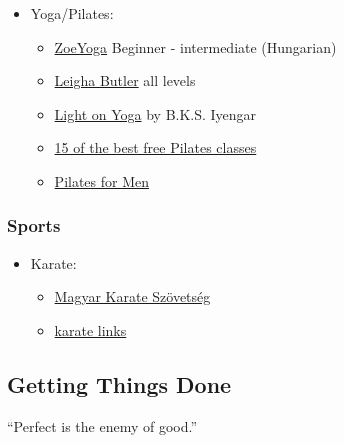 \documentclass{article}
\begin{document}
\begin{itemize}
    \item Yoga/Pilates:
    \begin{itemize}
        \item \href{https://www.facebook.com/kosazoe}{ZoeYoga} Beginner - intermediate (Hungarian)
        \item \href{https://www.youtube.com/channel/UCmHii9X_Ct0uWGOE-DibvbQ}{Leigha Butler} all levels
        \item \href{https://www.goodreads.com/book/show/56301.Light_on_Yoga}{Light on Yoga} by B.K.S. Iyengar
        \item \href{https://www.womenshealthmag.com/uk/fitness/workouts/a707014/best-pilates-youtube-workouts/}{15 of the best free Pilates classes}
        \item \href{https://www.healthline.com/nutrition/pilates-for-men}{Pilates for Men}
    \end{itemize}
\end{itemize}

\subsubsection{Sports}

\begin{itemize}
    \item Karate:
    \begin{itemize}
        \item \href{http://karate.hu/}{Magyar Karate Szövetség}
        \item \href{https://shotokan-budapest.hu/karate-linkek/}{karate links}
    \end{itemize}
\end{itemize}


\subsection{Getting Things Done}

\vspace{1cm}
{``Perfect is the enemy of good.''
\\[5pt]
}
\end{document}
